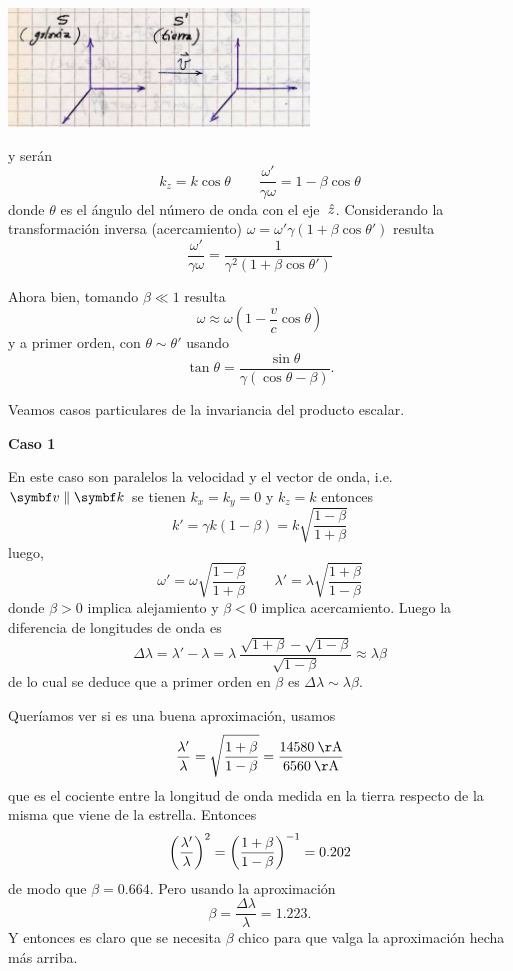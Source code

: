 \documentclass[10pt,oneside]{CBFT_book}
\begin{document}
\includegraphics[width=0.6\textwidth]{images/fig_ft1_sperel_doppler1.jpg}

y serán
\[
	k_z = k \cos\theta \qquad 
	\frac{\omega'}{\gamma \omega} = 1 - \beta \cos \theta
\]
donde $\theta$ es el ángulo del número de onda con el eje $\:\hat{z}$.
Considerando la transformación inversa (acercamiento)
$ \omega  = \omega' \gamma \left( 1 + \beta \cos\theta' \right) $ resulta
\[
	\frac{\omega'}{\gamma \omega} = \frac{ 1 }{ \gamma^2( 1 + \beta \cos \theta' ) }
\]

Ahora bien, tomando $\beta \ll 1 $ resulta
\[
	\omega \approx \omega \left( 1 - \frac{v}{c} \cos\theta \right)
\]
y a primer orden, con $\theta \sim \theta'$ usando 
\[
	\tan\theta = \frac{\sin\theta}{\gamma(\cos\theta -\beta)}.
\]

Veamos casos particulares de la invariancia del producto escalar.

{\bf Caso 1}

En este caso son paralelos la velocidad y el vector de onda, i.e. $\vb{v} \parallel \vb{k}$
se tienen $k_x=k_y=0$ y $k_z=k$ entonces
\[
	k' =  \gamma k (1 - \beta) = k \sqrt{ \frac{1-\beta}{1+\beta} }
\]
luego,
\[
	\omega' = \omega \sqrt{ \frac{1-\beta}{1+\beta} } \qquad 
	\lambda' = \lambda \sqrt{ \frac{1+\beta}{1-\beta} }
\]
donde $\beta > 0 $ implica alejamiento y $\beta < 0 $ implica acercamiento.
Luego la diferencia de longitudes de onda es
\[
	\Delta \lambda = \lambda' - \lambda = 
	\lambda \: \frac{ \sqrt{1+\beta} - \sqrt{1-\beta} }{ \sqrt{1-\beta} } 
	\approx \lambda \beta
\]
de lo cual se deduce que a primer orden en $\beta$ es $\Delta\lambda \sim \lambda\beta$.

Queríamos ver si es una buena aproximación, usamos
\[
	\frac{\lambda'}{\lambda} = \sqrt{\frac{1+\beta}{1-\beta}} = 
	\frac{ 14580 \:\mathrm{ \AA} }{ 6560 \:\mathrm{ \AA}}
\]
que es el cociente entre la longitud de onda medida en la tierra respecto de la misma
que viene de la estrella.
Entonces
\[
	\left( \frac{ \lambda' }{ \lambda } \right)^2 = \left( \frac{ 1+\beta }{ 1-\beta } \right)^{-1} = 0.202
\]
de modo que $\beta = 0.664$. Pero usando la aproximación
\[
	\beta = \frac{\Delta \lambda}{\lambda} = 1.223.
\]
Y entonces es claro que se necesita $\beta$ chico para que valga la aproximación hecha
más arriba.
\end{document}
